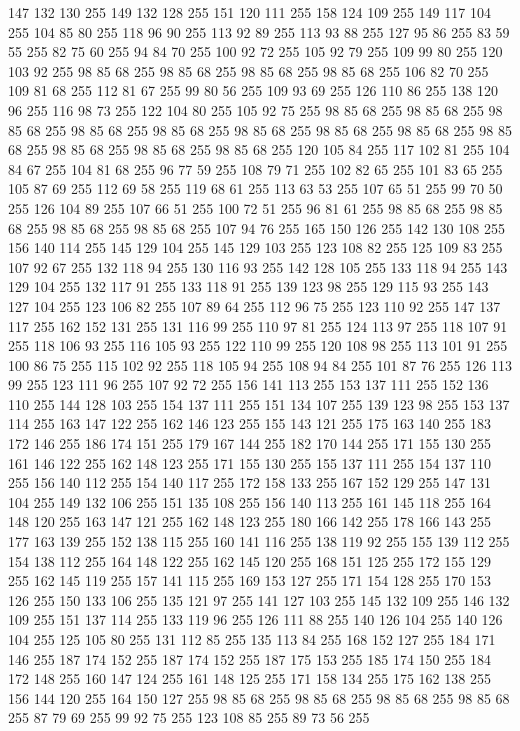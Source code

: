 147 132 130 255 149 132 128 255 151 120 111 255 158 124 109 255 149 117 104 255 104 85 80 255 118 96 90 255 113 92 89 255 113 93 88 255 127 95 86 255 83 59 55 255 82 75 60 255 94 84 70 255 100 92 72 255 105 92 79 255 109 99 80 255 120 103 92 255 98 85 68 255 98 85 68 255 98 85 68 255 98 85 68 255 106 82 70 255 109 81 68 255 112 81 67 255 99 80 56 255 109 93 69 255 126 110 86 255 138 120 96 255 116 98 73 255 122 104 80 255 105 92 75 255 98 85 68 255 98 85 68 255 98 85 68 255 98 85 68 255 98 85 68 255 98 85 68 255 98 85 68 255 98 85 68 255 98 85 68 255 98 85 68 255 98 85 68 255 98 85 68 255 120 105 84 255 117 102 81 255 104 84 67 255 104 81 68 255 96 77 59 255 108 79 71 255 102 82 65 255 101 83 65 255 105 87 69 255 112 69 58 255 119 68 61 255 113 63 53 255 107 65 51 255 99 70 50 255 126 104 89 255 107 66 51 255 100 72 51 255 96 81 61 255 98 85 68 255 98 85 68 255 98 85 68 255
98 85 68 255 107 94 76 255 165 150 126 255 142 130 108 255 156 140 114 255 145 129 104 255 145 129 103 255 123 108 82 255 125 109 83 255 107 92 67 255 132 118 94 255 130 116 93 255 142 128 105 255 133 118 94 255 143 129 104 255 132 117 91 255 133 118 91 255 139 123 98 255 129 115 93 255 143 127 104 255 123 106 82 255 107 89 64 255 112 96 75 255 123 110 92 255 147 137 117 255 162 152 131 255 131 116 99 255 110 97 81 255 124 113 97 255 118 107 91 255 118 106 93 255 116 105 93 255 122 110 99 255 120 108 98 255 113 101 91 255 100 86 75 255 115 102 92 255 118 105 94 255 108 94 84 255 101 87 76 255 126 113 99 255 123 111 96 255 107 92 72 255 156 141 113 255 153 137 111 255 152 136 110 255 144 128 103 255 154 137 111 255 151 134 107 255 139 123 98 255 153 137 114 255 163 147 122 255 162 146 123 255 155 143 121 255 175 163 140 255 183 172 146 255 186 174 151 255 179 167 144 255 182 170 144 255 171 155 130 255 161 146 122 255 162 148 123 255 171 155 130 255 155 137 111 255
154 137 110 255 156 140 112 255 154 140 117 255 172 158 133 255 167 152 129 255 147 131 104 255 149 132 106 255 151 135 108 255 156 140 113 255 161 145 118 255 164 148 120 255 163 147 121 255 162 148 123 255 180 166 142 255 178 166 143 255 177 163 139 255 152 138 115 255 160 141 116 255 138 119 92 255 155 139 112 255 154 138 112 255 164 148 122 255 162 145 120 255 168 151 125 255 172 155 129 255 162 145 119 255 157 141 115 255 169 153 127 255 171 154 128 255 170 153 126 255 150 133 106 255 135 121 97 255 141 127 103 255 145 132 109 255 146 132 109 255 151 137 114 255 133 119 96 255 126 111 88 255 140 126 104 255 140 126 104 255 125 105 80 255 131 112 85 255 135 113 84 255 168 152 127 255 184 171 146 255 187 174 152 255 187 174 152 255 187 175 153 255 185 174 150 255 184 172 148 255 160 147 124 255 161 148 125 255 171 158 134 255 175 162 138 255 156 144 120 255 164 150 127 255 98 85 68 255 98 85 68 255 98 85 68 255 98 85 68 255 87 79 69 255 99 92 75 255 123 108 85 255 89 73 56 255
